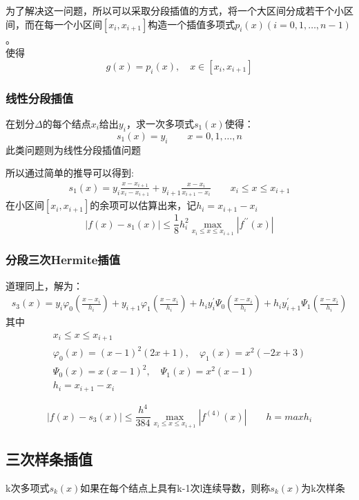 \documentclass[12pt]{report}
\numberwithin{equation}{section}
\begin{document}
	为了解决这一问题，所以可以采取分段插值的方式，将一个大区间分成若干个小区间，而在每一个小区间$[x_i , x_{i+1}]$构造一个插值多项式$p_i (x)(i=0, 1, \ldots , n-1)$。 \\
	使得
	$$
	g(x) = p_i(x), \quad x \in [x_i , x_{i+1}]
	$$

	\subsubsection{线性分段插值}
	在划分$\Delta$的每个结点$x_i$给出$y_i$，求一次多项式$s_1 (x)$使得：
	$$
	s_1 (x) = y_i \quad \quad x = 0, 1, \ldots , n
	$$
	此类问题则为线性分段插值问题

	所以通过简单的推导可以得到:
	\begin{equation} \tag{2.17} \label{2.17}
		\begin{aligned}
			s_1 (x) = y_i \frac{x - x_{i+1}}{x_i - x_{i+1}} + y_{i+1} \frac{x - x_i}{x_{i+1} - x_i} \quad \quad x_i \leq x \leq x_{i+1}
		\end{aligned}
	\end{equation}
	在小区间$[x_i , x_{i+1}]$的余项可以估算出来，记$h_i = x_{i+1} - x_i$
	$$
	|f(x) - s_1 (x)| \leq \frac{1}{8} h_i^2 \max_{x_i \leq x \leq x_{i+1}} |f^{\prime \prime}(x)| 
	$$

	\subsubsection{分段三次Hermite插值}
	道理同上，解为：
	\begin{equation}  \tag{2.18} \label{2.18}
		\begin{aligned}
			s_3 (x) = y_i \varphi_0 (\frac{x - x_i}{h_i}) + y_{i+1} \varphi_1 (\frac{x - x_i}{h_i}) + h_i y_i^\prime \Psi_0 (\frac{x - x_i}{h_i}) + h_i y_{i+1}^\prime \Psi_1 (\frac{x - x_i}{h_i})
		\end{aligned}
	\end{equation}
	其中
	$$
	\begin{array}{l}
		x_{i} \leq x \leq x_{i+1} \\ 
		\varphi_{0}(x)=(x-1)^{2}(2 x+1), \quad \varphi_{1}(x)=x^{2}(-2 x+3) \\
		\Psi_{0}(x)=x(x-1)^{2}, \quad \Psi_{1}(x)=x^{2}(x-1) \\
		h_{i}=x_{i+1}-x_{i}
	\end{array}
	$$

	$$
	|f(x) - s_3 (x)| \leq \frac{h^4}{384} \max_{x_i \leq x \leq x_{i+1}} |f^{(4)}(x)| \quad \quad h = max h_i
	$$

	\subsection{三次样条插值}
	k次多项式$s_k(x)$如果在每个结点上具有k-1次l连续导数，则称$s_k(x)$为k次样条
\end{document}

